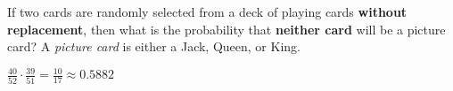 \documentclass[answers,addpoints,12pt]{exam}
\begin{document}
\begin{questions}
\question[10] If two cards are randomly selected from a deck
of playing cards {\bf without replacement},
then what is the probability that {\bf neither card}
will be a picture card?
A {\em picture card} is either a Jack, Queen, or King.
\begin{solution}
$\frac{40}{52}\cdot\frac{39}{51}=\frac{10}{17}\approx 0.5882$
\end{solution}

\end{questions}

\vfill\ifprintanswers\else
\begin{center}\gradetable[h][questions]\end{center}\fi
\end{document}
